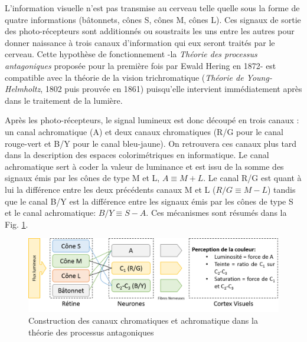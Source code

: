 	\par L'information visuelle n'est pas transmise au cerveau telle quelle sous la forme de quatre informations (bâtonnets, cônes S, cônes M, cônes L). Ces signaux de sortie des photo-récepteurs sont additionnés ou soustraits les uns entre les autres pour donner naissance à trois canaux d'information qui eux seront traités par le cerveau. Cette hypothèse de fonctionnement  -la \textit{Théorie des processus antagoniques} proposée pour la première fois par Ewald Hering en 1872- est compatible avec la théorie de la vision trichromatique (\textit{Théorie de Young-Helmholtz}, 1802 puis prouvée en 1861) puisqu'elle intervient immédiatement après dans le traitement de la lumière.
	
	\par Après les photo-récepteurs, le signal lumineux est donc découpé en trois canaux \citep{glassner_principles_1995,winkler_issues_1999}: un canal achromatique (A) et deux canaux chromatiques (R/G pour le canal rouge-vert et B/Y pour le canal bleu-jaune). On retrouvera ces canaux plus tard dans la description des espaces colorimétriques en informatique. Le canal achromatique sert à coder la valeur de luminance et est issu de la somme des signaux émis par les cônes de type M et L, $A \equiv M + L$. Le canal R/G est quant à lui la différence entre les deux précédents canaux M et L ($R/G \equiv M - L$) tandis que le canal B/Y est la différence entre les signaux émis par les cônes de type S et le canal achromatique: $B/Y \equiv S - A$. Ces mécanismes sont résumés dans la Fig. \ref{fig:opponent_colors_theory}.
	
	\begin{figure}
		\centering
		\includegraphics[scale=.6]{Figures/OpponentColorsTheory}
		\caption{Construction des canaux chromatiques et achromatique dans la théorie des processus antagoniques}
		\label{fig:opponent_colors_theory}
	\end{figure}
	
